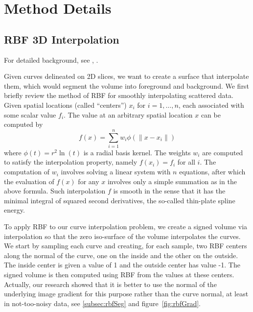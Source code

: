 %

\section{Method Details}
\label{sec:sweep}


\subsection{RBF 3D Interpolation}
For detailed background, see \cite{buhmann2003radial}, \cite{press2007numerical}.

Given curves delineated on 2D slices, we want to create a surface that interpolate them, which would segment the volume into foreground and background. We first briefly review the method of RBF for smoothly interpolating scattered data. Given spatial locations (called ``centers'') $x_i$ for $i=1,\ldots,n$, each associated with some scalar value $f_i$. The value at an arbitrary spatial location $x$ can be computed by
\[
f(x) = \sum_{i=1}^{n} w_i \phi (\|x - x_i\|)
\]
where $\phi (t)  = r^{2}  \ln (t)$ is a radial basis kernel. The weights $w_i$ are computed to satisfy the interpolation property, namely $f(x_i)=f_i$ for all $i$. The computation of $w_i$ involves solving a linear system with $n$ equations, after which the evaluation of $f(x)$ for any $x$ involves only a simple summation as in the above formula. Such interpolation $f$ is smooth in the sense that it has the minimal integral of squared second derivatives, the so-called thin-plate spline energy.

To apply RBF to our curve interpolation problem, we create a signed volume via interpolation so that the zero iso-surface of the volume interpolates the curves. We start by sampling each curve and creating, for each sample, two RBF centers along the normal of the curve, one on the inside and the other on the outside. The inside center is given a value of 1 and the outside center has value -1. The signed volume is then computed using RBF from the values at these centers.
Actually, our research showed that it is better to use the normal of the underlying image gradient for this purpose rather than the curve normal, at least in not-too-noisy data, see \ref{subsec:rbfSeg} and figure~\ref{fig:rbfGrad}.

